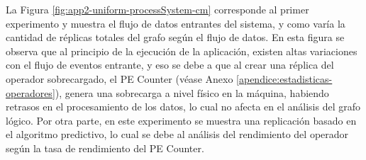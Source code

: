 %
%
%
%
%


La Figura \ref{fig:app2-uniform-processSystem-cm} \normalsize{corresponde al primer experimento y muestra el flujo de datos entrantes del sistema, y como var\'ia la cantidad de r\'eplicas totales del grafo seg\'un el flujo de datos.} En esta figura \normalsize{se observa que al principio de la ejecuci\'on de la aplicaci\'on, existen altas variaciones con el flujo de eventos entrante, y eso se debe a que al crear una r\'eplica del operador sobrecargado, el PE Counter} (v\'ease Anexo \ref{apendice:estadisticas-operadores}), \normalsize{genera una sobrecarga a nivel f\'isico en la m\'aquina, habiendo retrasos en el procesamiento de los datos, lo cual no afecta en el an\'alisis del grafo l\'ogico. Por otra parte, en este experimento se muestra una replicaci\'on basado en el algoritmo predictivo, lo cual se debe al an\'alisis del rendimiento del operador seg\'un la tasa de rendimiento del PE Counter.}


